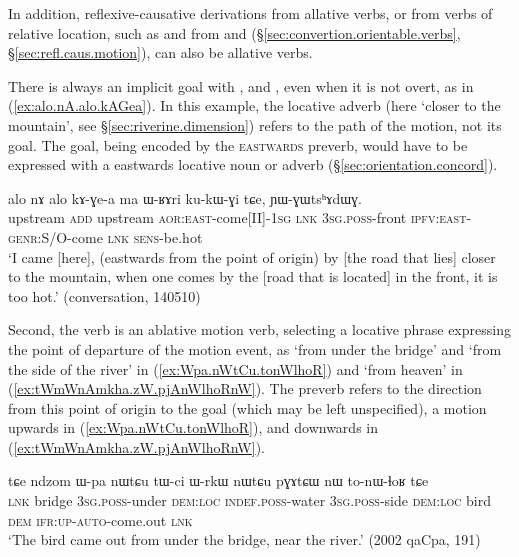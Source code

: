In addition, reflexive-causative derivations from allative verbs, or from verbs of relative location, such as  and  from  and  (§\ref{sec:convertion.orientable.verbs}, §\ref{sec:refl.caus.motion}), can also be allative verbs.

There is always an implicit goal with ,  and , even when it is not overt, as in (\ref{ex:alo.nA.alo.kAGea}). In this example, the locative adverb  (here `closer to the mountain', see §\ref{sec:riverine.dimension}) refers to the path of the motion, not its goal. The goal, being encoded by the \textsc{eastwards} preverb, would have to be expressed with a eastwards locative noun or adverb (§\ref{sec:orientation.concord}).

\begin{exe}
\ex \label{ex:alo.nA.alo.kAGea}
\gll alo nɤ alo kɤ-ɣe-a ma ɯ-ʁɤri ku-kɯ-ɣi tɕe, ɲɯ-ɣɯtsʰɤdɯɣ. \\
upstream \textsc{add} upstream \textsc{aor}:\textsc{east}-come[II]-\textsc{1sg} \textsc{lnk} \textsc{3sg}.\textsc{poss}-front \textsc{ipfv}:\textsc{east}-\textsc{genr}:S/O-come \textsc{lnk} \textsc{sens}-be.hot \\
\glt `I came [here], (eastwards from the point of origin) by [the road that lies] closer to the mountain, when one comes by the [road that is located] in the front, it is too hot.' (conversation, 140510)
\end{exe}

Second, the verb  is an ablative motion verb, selecting a locative phrase expressing the point of departure of the motion event, as  `from under the bridge' and  `from the side of the river' in (\ref{ex:Wpa.nWtCu.tonWlhoR}) and  `from heaven' in (\ref{ex:tWmWnAmkha.zW.pjAnWlhoRnW}). The preverb refers to the direction from this point of origin to the goal (which may be left unspecified), a motion upwards in (\ref{ex:Wpa.nWtCu.tonWlhoR}), and downwards in (\ref{ex:tWmWnAmkha.zW.pjAnWlhoRnW}).

\begin{exe}
\ex \label{ex:Wpa.nWtCu.tonWlhoR}
\gll  tɕe ndzom ɯ-pa nɯtɕu tɯ-ci ɯ-rkɯ nɯtɕu pɣɤtɕɯ nɯ to-nɯ-ɬoʁ tɕe \\
\textsc{lnk} bridge \textsc{3sg}.\textsc{poss}-under \textsc{dem}:\textsc{loc} \textsc{indef}.\textsc{poss}-water \textsc{3sg}.\textsc{poss}-side \textsc{dem}:\textsc{loc} bird \textsc{dem} \textsc{ifr}:\textsc{up}-\textsc{auto}-come.out \textsc{lnk} \\
\glt  `The bird came out from under the bridge, near the river.' (2002 qaCpa, 191)
\end{exe}

